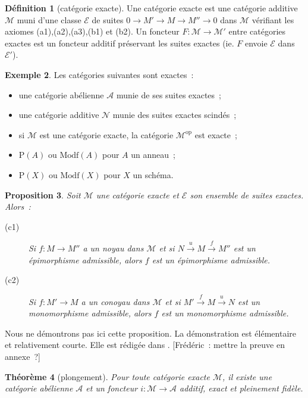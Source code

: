 \documentclass{amsart}
\theoremstyle{plain}
\newtheorem{theo}{Théorème}[section]
\newtheorem{prop}[theo]{Proposition}
\theoremstyle{definition}
\newtheorem{defi}[theo]{Définition}
\newtheorem{ex}[theo]{Exemple}
\theoremstyle{remark}
\newcommand{\M}{\mathcal{M}}
\newcommand{\A}{\mathcal{A}}
\newcommand{\E}{\mathcal{E}}
\newcommand{\op}{^\mathrm{op}}
\newcommand{\Proj}[1]{\mathrm{P}({#1})}
\newcommand{\Modf}[1]{\mathrm{Modf}({#1})}
\newcommand{\ra}{\rightarrow}
\newcommand{\exa}[3]{0\ra {#1}\ra {#2}\ra {#3}\ra 0}
\begin{document}
\begin{defi}[catégorie exacte]
  Une catégorie exacte est une catégorie additive $\M$ muni d'une classe $\E$ de suites $\exa{M'}{M}{M''}$ dans $\M$ vérifiant les axiomes
  (a1),(a2),(a3),(b1) et (b2).
  Un foncteur $F:\M\ra \M'$ entre catégories exactes est un foncteur additif préservant les suites exactes (ie. $F$ envoie $\E$ dans $\E'$).
\end{defi}

\begin{ex}
  Les catégories suivantes sont exactes~:
  \begin{itemize}
    \item une catégorie abélienne $\A$ munie de ses suites exactes~;
    \item une catégorie additive $\mathcal{N}$ munie des suites exactes scindés~;
    \item si $\M$ est une catégorie exacte, la catégorie $\M\op$ est exacte~;
    \item $\Proj{A}$ ou $\Modf{A}$ pour $A$ un anneau~;
    \item $\Proj{X}$ ou $\Modf{X}$ pour $X$ un schéma.
  \end{itemize}
\end{ex}

\begin{prop}
  Soit $\M$ une catégorie exacte et $\E$ son ensemble de suites exactes. Alors~:
  \begin{description}
    \item[(c1)] Si $f:M\ra M''$ a un noyau dans $\M$ et si $N\xrightarrow{u} M\xrightarrow{f} M''$ est un épimorphisme admissible,
                alors $f$ est un épimorphisme admissible.
    \item[(c2)] Si $f:M'\ra M$ a un conoyau dans $\M$ et si $M'\xrightarrow{f} M\xrightarrow{u} N$ est un monomorphisme admissible,
    alors $f$ est un monomorphisme admissible.
  \end{description}
\end{prop}

Nous ne démontrons pas ici cette proposition. La démonstration est élémentaire et relativement courte. Elle est rédigée dans \cite[A.1]{Kell}.
[Frédéric~: mettre la preuve en annexe~?]

\begin{theo}[plongement]\label{plongementExacte}
  Pour toute catégorie exacte $\M$, il existe une catégorie abélienne $\A$ et un foncteur $i:\M\ra \A$ additif, exact et pleinement fidèle.
\end{theo}
\end{document}
